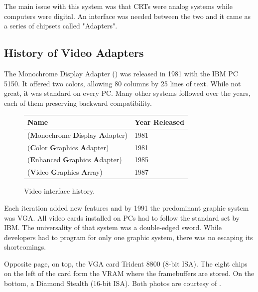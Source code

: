 \documentclass[book.tex]{subfiles}
\begin{document}
\par
The main issue with this system was that CRTs were analog systems while computers were digital. An interface was needed between the two and it came as a series of chipsets called "Adapters". 

  \subsection{History of Video Adapters}

The Monochrome Display Adapter () was released in 1981 with the IBM PC 5150. It offered two colors, allowing 80 columns by 25 lines of text.  While not great, it was standard on every PC. Many other systems followed over the years, each of them preserving backward compatibility.
\bigskip
  
 \begin{figure}[H]
\centering  
\begin{tabularx}{\textwidth}{ X  Y }
  \toprule
  \textbf{Name} &  \textbf{Year Released} \\
  \toprule {}
   (\textbf{M}onochrome
   \textbf{D}isplay
   \textbf{A}dapter) & 1981 
   \\ 
   (\textbf{C}olor
   \textbf{G}raphics
   \textbf{A}dapter) & 1981 
    \\ 
   (\textbf{E}nhanced
   \textbf{G}raphics
   \textbf{A}dapter) & 1985
   \\ 
   (\textbf{V}ideo
   \textbf{G}raphics
   \textbf{A}rray)  & 1987
    \\
  \toprule
\end{tabularx}
\caption{Video interface history.}\label{fig:vga_history}
\end{figure}

Each iteration added new features and by 1991 the predominant graphic system was VGA. All video cards installed on PCs had to follow the standard set by IBM. The universality of that system was a double-edged sword. While developers had to program for only one graphic system, there was no escaping its shortcomings.\\
\par
Opposite page, on top, the VGA card Trident 8800 (8-bit ISA). The eight chips on the left of the card form the VRAM where the framebuffers are stored\protect\footnotemark. On the bottom, a Diamond Stealth (16-bit ISA). Both photos are courtesy of .
\pagebreak
\end{document}
